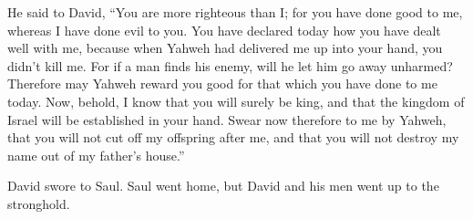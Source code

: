 {He said to David, “You are more righteous than I; for you have done good to me, whereas I have done evil to you.
You have declared today how you have dealt well with me, because when Yahweh had delivered me up into your hand, you didn’t kill me.
For if a man finds his enemy, will he let him go away unharmed? Therefore may Yahweh reward you good for that which you have done to me today.
Now, behold, I know that you will surely be king, and that the kingdom of Israel will be established in your hand.
Swear now therefore to me by Yahweh, that you will not cut off my offspring after me, and that you will not destroy my name out of my father’s house.”
\par }{\PP {}David swore to Saul. Saul went home, but David and his men went up to the stronghold.

}
